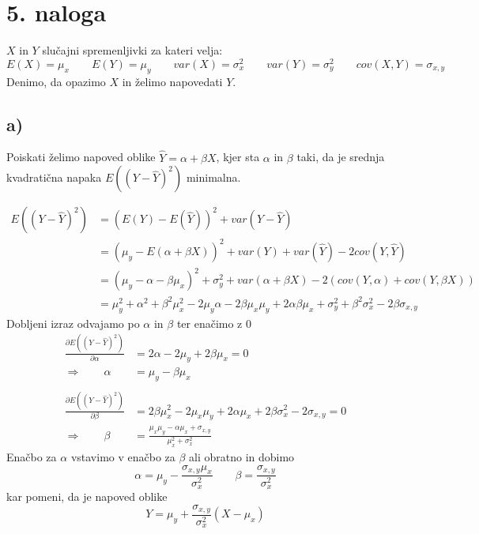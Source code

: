 \documentclass[A4paper, 11pt]{article}
\begin{document}

\section*{5. naloga}
$X$ in $Y$ slučajni spremenljivki za kateri velja:
\[ E(X) = \mu_x \qquad E(Y) = \mu_y \qquad var(X) = \sigma_x^2 \qquad var(Y) = \sigma_y^2 \qquad cov(X,Y) = \sigma_{x,y} \]
Denimo, da opazimo $X$ in želimo napovedati $Y$.

\subsection*{a)}
Poiskati želimo napoved oblike $\hat{Y} = \alpha + \beta X$, kjer sta $\alpha$ in $\beta$ taki, da je srednja kvadratična napaka $E( (Y - \hat{Y})^2 )$ minimalna. 

\[
\begin{split}
E( (Y - \hat{Y})^2 ) & = (E(Y) - E(\hat{Y}) )^2 + var(Y - \hat{Y}) \\
                                    & = ( \mu_y - E(\alpha + \beta X) )^2 + var(Y) + var(\hat{Y}) - 2cov(Y,\hat{Y}) \\
                                    & = ( \mu_y - \alpha - \beta \mu_x) ^2 + \sigma_y^2 + var(\alpha + \beta X) - 2(cov(Y, \alpha) + cov(Y,\beta X)) \\
                                    & = \mu_y^2 + \alpha^2 + \beta^2 \mu_x^2 - 2 \mu_y \alpha - 2 \beta \mu_x \mu_y + 2 \alpha \beta \mu_x + \sigma_y^2 + \beta^2 \sigma_x^2 - 2 \beta \sigma_{x,y}
\end{split}
\]
Dobljeni izraz odvajamo po $\alpha$ in $\beta$ ter enačimo z 0
\[
\begin{split}
\frac{\partial E( (Y - \hat{Y})^2 )}{\partial \alpha} & = 2 \alpha - 2 \mu_y + 2 \beta \mu_x = 0 \\
\Rightarrow \qquad                                       \alpha & = \mu_y - \beta \mu_x \\
\\
\frac{\partial E( (Y - \hat{Y})^2 )}{\partial \beta} & = 2 \beta \mu_x^2 - 2 \mu_x \mu_y + 2 \alpha \mu_x + 2 \beta \sigma_x^2 - 2 \sigma_{x,y} = 0 \\
\Rightarrow \qquad                                       \beta & = \frac{\mu_x \mu_y - \alpha \mu_x + \sigma_{x,y}}{\mu_x^2 + \sigma_x^2}
\end{split}
\]
Enačbo za $\alpha$ vstavimo v enačbo za $\beta$ ali obratno in dobimo
\[ \alpha = \mu_y - \frac{\sigma_{x,y} \mu_x}{\sigma_x^2} \qquad \beta = \frac{\sigma_{x,y}}{\sigma_x^2} \]
kar pomeni, da je napoved oblike
\[ Y = \mu_y + \frac{\sigma_{x,y}}{\sigma_x^2} (X - \mu_x) \]
\end{document}
